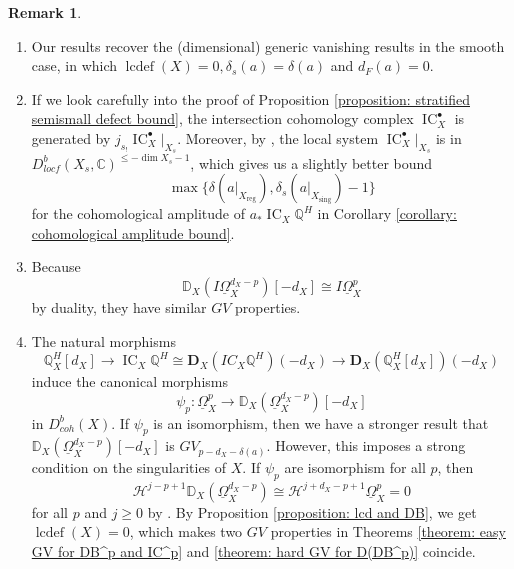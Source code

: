\documentclass[11pt]{amsart}
\theoremstyle{definition}
\newtheorem{remark}[equation]{Remark}
\theoremstyle{plain}
\renewcommand{\H}{\mathcal H}
\newcommand{\bD}{\mathbf D}
\newcommand{\CC}{\mathbb C}
\newcommand{\QQ}{\mathbb Q}
\newcommand{\DD}{\mathbb D}
\newcommand{\DB}{\underline{\Omega}} %
\DeclareMathOperator{\sing}{sing}
\DeclareMathOperator{\IC}{IC}
\DeclareMathOperator{\reg}{reg}
\DeclareMathOperator{\lcdef}{lcdef}
\begin{document}
\begin{remark}
    \begin{enumerate}
        \item Our results recover the (dimensional) generic vanishing results in the smooth case, in which $\lcdef(X) =0, \delta_s(a) = \delta(a)$ and $d_F(a) = 0$. 
        \item If we look carefully into the proof of Proposition \ref{proposition: stratified semismall defect bound}, the intersection cohomology complex $\IC_X^\bullet$ is generated by $j_{s_!} \IC_X^\bullet|_{X_s}$. Moreover, by \cite[Lemma 3.3.11]{Achar-pervers-sheaves}, the local system $\IC_X^\bullet|_{X_s}$ is in $D_{locf}^b(X_s, \CC)^{\le -\dim X_s - 1}$, which gives us a slightly better bound 
        \[\max\{\delta(a|_{X_{\reg}}),\delta_s(a|_{X_{\sing}}) - 1\}\]
        for the cohomological amplitude of $a_* \IC_X\QQ^H$ in Corollary \ref{corollary: cohomological amplitude bound}.
        \item Because
        \[\DD_X(I\DB_X^{d_X-p})[-d_X] \cong I\DB_X^p\]
        by duality, they have similar $GV$ properties.
        \item The natural morphisms 
        \[\QQ^H_X[d_X] \to \IC_X\QQ^H \cong \bD_X(IC_X\QQ^H)(-d_X) \to \bD_X(\QQ^H_X[d_X])(-d_X)\]
        induce the canonical morphisms 
        \[\psi_p: \DB^p_X \to \DD_X(\DB^{d_X-p}_X)[-d_X]\]
        in $D_{coh}^b(X)$. If $\psi_p$ is an isomorphism, then we have a stronger result that  $\DD_X(\DB^{d_X-p}_X)[-d_X]$ is $GV_{p-d_X-\delta(a)}$. However, this imposes a strong condition on the singularities of $X$. If $\psi_p$ are isomorphism for all $p$, then 
        \[\H^{j-p+1} \DD_X (\DB^{d_X-p}_X) \cong \H^{j+d_X-p+1} \DB^p_X = 0\]
        for all $p$ and $j\ge 0$ by \cite[Theorem 7.29]{peters-steenbrink}. By Proposition \ref{proposition: lcd and DB}, we get $\lcdef(X) = 0$, which makes two $GV$ properties in Theorems \ref{theorem: easy GV for DB^p and IC^p}  and \ref{theorem: hard GV for D(DB^p)} coincide.  
    \end{enumerate}
\end{remark}
\end{document}
